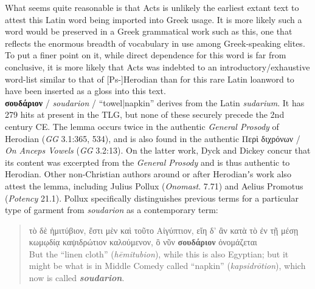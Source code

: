 What seems quite reasonable is that Acts is unlikely %
the earliest extant text to attest this Latin word being imported into Greek usage. %
It is more likely such a word would be preserved in a Greek grammatical work such as this, %
one that reflects the enormous breadth of vocabulary in use among Greek-speaking elites. %
To put a finer point on it, while direct dependence for this word is far from conclusive, %
it is more likely that Acts was indebted to an introductory/exhaustive word-list similar to that of [Ps-]Herodian %
than for this rare Latin loanword to have been inserted as a gloss into this text. \\[1mm] %

\noindent{}\textbf{σουδάριον} / \textit{soudarion} / “towel|napkin” %
derives from the Latin \textit{sudarium}. %
It has 279 hits at present in the TLG, %
but none of these securely precede the 2nd century CE. %
The lemma occurs twice in the authentic \textit{General Prosody} of Herodian (\textit{GG} 3.1:365, 534), %
and is also found in the authentic Περὶ διχρόνων / \textit{On Anceps Vowels} (\textit{GG} 3.2:13). %
On the latter work, Dyck and Dickey concur that its content was excerpted from the \textit{General Prosody} %
and is thus authentic to Herodian. %
Other non-Christian authors around or after Herodianʼs work %
also attest the lemma, including Julius Pollux (\textit{Onomast}. 7.71) and Aelius Promotus (\textit{Potency} 21.1). %
Pollux specifically distinguishes previous terms for a particular type %
of garment from \textit{soudarion} as a contemporary term: \clearpage %

 \begin{quote}τὸ δὲ ἡμιτύβιον, ἔστι μὲν καὶ τοῦτο Αἰγύπτιον, %
 εἴη δ’ ἂν κατὰ τὸ ἐν τῇ μέσῃ κωμῳδίᾳ καψιδρώτιον καλούμενον,
 ὃ νῦν \textbf{σουδάριον} ὀνομάζεται \\[1mm] %
 But the “linen cloth” (\textit{hēmitubion}), while this is also Egyptian; %
 but it might be what is in Middle Comedy called “napkin” (\textit{kapsidrōtion}), %
 which now is called \textit{\textbf{soudarion}}.\end{quote} %
\vspace*{2mm}

